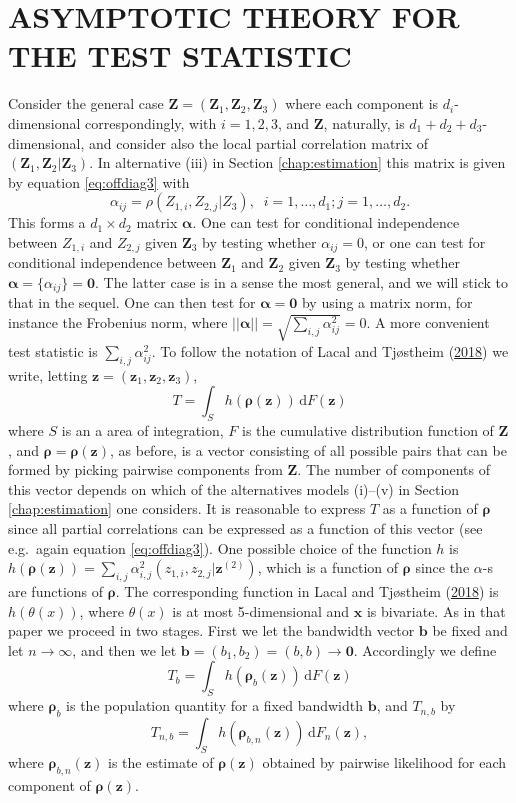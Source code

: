 \documentclass[
  12pt,
  letterpaper]{article}
\numberwithin{equation}{section}
\newcommand{\x}{\bm{x}}
\newcommand{\Z}{\bm{Z}}
\newcommand{\z}{\bm{z}}
\newcommand{\ztwo}{\bm{z}^{(2)}}
\newcommand{\frho}{\bm{\rho}}
\newcommand{\bb}{\bm{b}}
\newcommand{\falpha}{\bm{\alpha}}
\newcommand{\di}{\,\textrm{d}}
\begin{document}
\hypertarget{asymptotic-theory-for-the-test-statistic}{%
\section{ASYMPTOTIC THEORY FOR THE TEST STATISTIC}\label{asymptotic-theory-for-the-test-statistic}}

Consider the general case \(\Z = (\Z_1, \Z_2, \Z_3)\) where each component is \(d_i\)-dimensional correspondingly, with \(i = 1,2,3\), and \(\Z\), naturally, is \(d_1+d_2+d_3\)-dimensional, and consider also the local partial correlation matrix of \((\Z_1,\Z_2|\Z_3)\). In alternative (iii) in Section \ref{chap:estimation} this matrix is given by equation \eqref{eq:offdiag3} with
\[
\alpha_{ij} = \rho(Z_{1,i},Z_{2,j}|Z_3), \;\; i=1,\ldots,d_1; j = 1,\dots,d_2.
\]
This forms a \(d_1 \times d_2\) matrix \({\falpha}\). One can test for conditional independence between \(Z_{1,i}\) and \(Z_{2,j}\) given \(\Z_3\) by testing whether \(\alpha_{ij}=0\), or one can test for conditional independence between \(\Z_1\) and \(\Z_2\) given \(\Z_3\) by testing whether \({\falpha} = \{\alpha_{ij}\} = {\bm{0}}\). The latter case is in a sense the most general, and we will stick to that in the sequel. One can then test for \({\falpha} = {\bm{0}}\) by using a matrix norm, for instance the Frobenius norm, where \(||{\falpha}|| = \sqrt{\sum_{i,j} \alpha_{ij}^2} = 0\). A more convenient test statistic is \(\sum_{i,j} \alpha_{ij}^2\). To follow the notation of Lacal and Tjøstheim (\protect\hyperlink{ref-lacal2018estimating}{2018}) we write, letting \(\z=(\z_1,\z_2,\z_3)\),
\[
T = \int_S h(\frho(\z)) \di F(\z)
\]
where \(S\) is an a area of integration, \(F\) is the cumulative distribution function of \(\Z\), and \(\frho = \frho(\z)\), as before, is a vector consisting of all possible pairs that can be formed by picking pairwise components from \(\Z\). The number of components of this vector depends on which of the alternatives models (i)--(v) in Section \ref{chap:estimation} one considers. It is reasonable to express \(T\) as a function of \(\frho\) since all partial correlations can be expressed as a function of this vector (see e.g.~again equation \eqref{eq:offdiag3}). One possible choice of the function \(h\) is \(h(\frho(\z)) = \sum_{i,j} \alpha_{i,j}^2(z_{1,i},z_{2,j}|\ztwo)\), which is a function of \(\frho\) since the \(\alpha\)-s are functions of \(\frho\). The corresponding function in Lacal and Tjøstheim (\protect\hyperlink{ref-lacal2018estimating}{2018}) is \(h(\theta(x))\), where \(\theta(x)\) is at most 5-dimensional and \(\x\) is bivariate. As in that paper we proceed in two stages. First we let the bandwidth vector \(\bb\) be fixed and let \(n \to \infty\), and then we let \(\bb = (b_1,b_2) = (b,b) \to \bm{0}\).
Accordingly we define
\[
T_b = \int_S h(\frho_b(\z)) \di F(\z) 
\]
where \(\frho_b\) is the population quantity for a fixed bandwidth \(\bb\), and \(T_{n,b}\) by
\[
T_{n,b} = \int_S h(\frho_{b,n}(\z)) \di F_n(\z),
\]
where \(\frho_{b,n}(\z)\) is the estimate of \(\frho(\z)\) obtained by pairwise likelihood for each component of \(\frho(\z)\).
\end{document}
